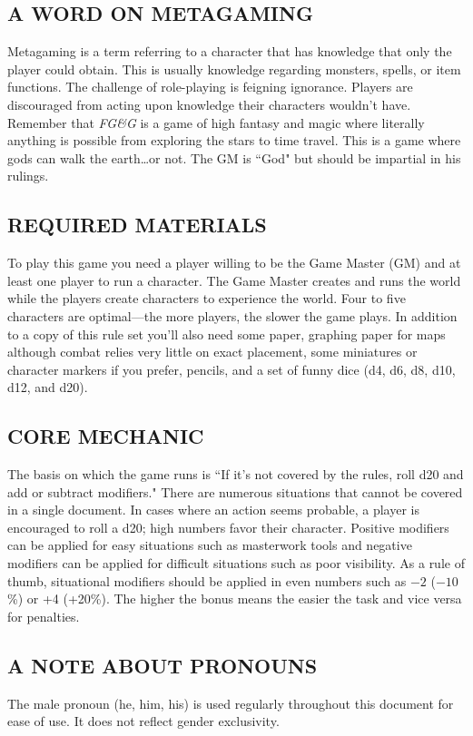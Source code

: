 \begin{multicols}{2}
\subsection{A WORD ON METAGAMING}
Metagaming is a term referring to a character that has knowledge that only the player could obtain.  This is usually knowledge regarding monsters, spells, or item functions.  The challenge of role-playing is feigning ignorance.  Players are discouraged from acting upon knowledge their characters wouldn't have.  Remember that \textit{FG\&G}\texttrademark{} is a game of high fantasy and magic where literally anything is possible from exploring the stars to time travel.  This is a game where gods can walk the earth\ldots or not.  The GM is ``God" but should be impartial in his rulings.

\subsection{REQUIRED MATERIALS}
To play this game you need a player willing to be the Game Master (GM) and at least one player to run a character.  The Game Master creates and runs the world while the players create characters to experience the world.  Four to five characters are optimal---the more players, the slower the game plays.  In addition to a copy of this rule set you'll also need some paper, graphing paper for maps although combat relies very little on exact placement, some miniatures or character markers if you prefer, pencils, and a set of funny dice (d4, d6, d8, d10, d12, and d20).  

\subsection{CORE MECHANIC}
The basis on which the game runs is ``If it's not covered by the rules, roll d20 and add or subtract modifiers."  There are numerous situations that cannot be covered in a single document.  In cases where an action seems probable, a player is encouraged to roll a d20; high numbers favor their character.  Positive modifiers can be applied for easy situations such as masterwork tools and negative modifiers can be applied for difficult situations such as poor visibility.  As a rule of thumb, situational modifiers should be applied in even numbers such as $-2$ ($-10$\%) or +4 (+20\%).  The higher the bonus means the easier the task and vice versa for penalties.

 
\subsection{A NOTE ABOUT PRONOUNS}
The male pronoun (he, him, his) is used regularly throughout this document for ease of use.  It does not reflect gender exclusivity.


\end{multicols}
